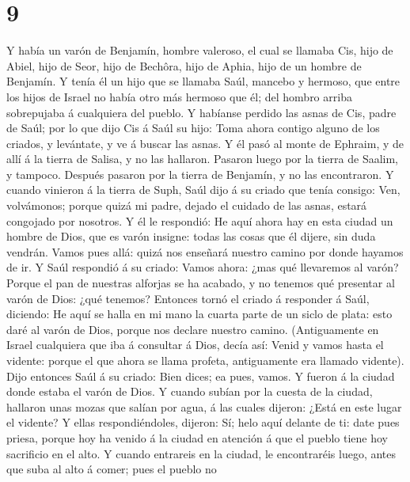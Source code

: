 \hypertarget{section-8}{%
\section{9}\label{section-8}}

 Y había un varón de Benjamín, hombre valeroso, el cual se
llamaba Cis, hijo de Abiel, hijo de Seor, hijo de Bechôra, hijo de
Aphia, hijo de un hombre de Benjamín.  Y tenía él un hijo
que se llamaba Saúl, mancebo y hermoso, que entre los hijos de Israel no
había otro más hermoso que él; del hombro arriba sobrepujaba á
cualquiera del pueblo.  Y habíanse perdido las asnas de Cis,
padre de Saúl; por lo que dijo Cis á Saúl su hijo: Toma ahora contigo
alguno de los criados, y levántate, y ve á buscar las asnas.
 Y él pasó al monte de Ephraim, y de allí á la tierra de
Salisa, y no las hallaron. Pasaron luego por la tierra de Saalim, y
tampoco. Después pasaron por la tierra de Benjamín, y no las
encontraron.  Y cuando vinieron á la tierra de Suph, Saúl
dijo á su criado que tenía consigo: Ven, volvámonos; porque quizá mi
padre, dejado el cuidado de las asnas, estará congojado por nosotros.
 Y él le respondió: He aquí ahora hay en esta ciudad un
hombre de Dios, que es varón insigne: todas las cosas que él dijere, sin
duda vendrán. Vamos pues allá: quizá nos enseñará nuestro camino por
donde hayamos de ir.  Y Saúl respondió á su criado: Vamos
ahora: ¿mas qué llevaremos al varón? Porque el pan de nuestras alforjas
se ha acabado, y no tenemos qué presentar al varón de Dios: ¿qué
tenemos?  Entonces tornó el criado á responder á Saúl,
diciendo: He aquí se halla en mi mano la cuarta parte de un siclo de
plata: esto daré al varón de Dios, porque nos declare nuestro camino.
 (Antiguamente en Israel cualquiera que iba á consultar á
Dios, decía así: Venid y vamos hasta el vidente: porque el que ahora se
llama profeta, antiguamente era llamado vidente).  Dijo
entonces Saúl á su criado: Bien dices; ea pues, vamos. Y fueron á la
ciudad donde estaba el varón de Dios.  Y cuando subían por
la cuesta de la ciudad, hallaron unas mozas que salían por agua, á las
cuales dijeron: ¿Está en este lugar el vidente?  Y ellas
respondiéndoles, dijeron: Sí; helo aquí delante de ti: date pues priesa,
porque hoy ha venido á la ciudad en atención á que el pueblo tiene hoy
sacrificio en el alto.  Y cuando entrareis en la ciudad, le
encontraréis luego, antes que suba al alto á comer; pues el pueblo no
